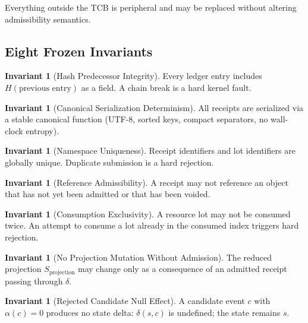 \documentclass[11pt,a4paper]{article}
\theoremstyle{plain}
\theoremstyle{definition}
\newtheorem{invariant}[theorem]{Invariant}
\theoremstyle{remark}
\begin{document}
Everything outside the TCB is peripheral and may be replaced without altering
admissibility semantics.

\subsection{Eight Frozen Invariants}
\label{sec:invariants}

\begin{invariant}[Hash Predecessor Integrity]
\label{inv:predecessor}
Every ledger entry includes $H(\text{previous entry})$ as a field.
A chain break is a hard kernel fault.
\end{invariant}

\begin{invariant}[Canonical Serialization Determinism]
\label{inv:canonical}
All receipts are serialized via a stable canonical function
(UTF-8, sorted keys, compact separators, no wall-clock entropy).
\end{invariant}

\begin{invariant}[Namespace Uniqueness]
\label{inv:uniqueness}
Receipt identifiers and lot identifiers are globally unique.
Duplicate submission is a hard rejection.
\end{invariant}

\begin{invariant}[Reference Admissibility]
\label{inv:reference}
A receipt may not reference an object that has not yet been admitted
or that has been voided.
\end{invariant}

\begin{invariant}[Consumption Exclusivity]
\label{inv:consumption}
A resource lot may not be consumed twice.
An attempt to consume a lot already in the consumed index triggers hard rejection.
\end{invariant}

\begin{invariant}[No Projection Mutation Without Admission]
\label{inv:no-mutation}
The reduced projection $S_{\mathrm{projection}}$ may change only as a consequence
of an admitted receipt passing through $\delta$.
\end{invariant}

\begin{invariant}[Rejected Candidate Null Effect]
\label{inv:null-effect}
A candidate event $c$ with $\alpha(c) = 0$ produces no state delta:
$\delta(s, c)$ is undefined; the state remains $s$.
\end{invariant}
\end{document}
